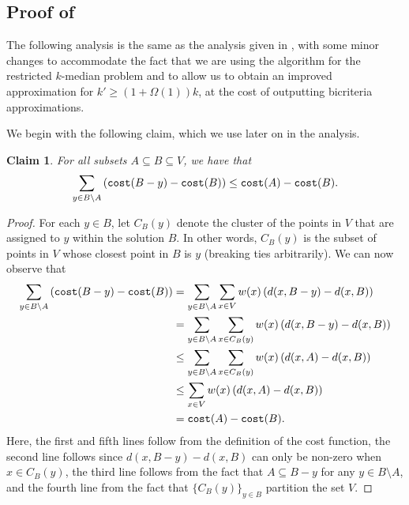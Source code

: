 \documentclass[11pt]{article}
\newcommand{\1}{\mathmybb{1}}
\newtheorem{claim}[theorem]{Claim}
\newcommand{\cost}{\textnormal{\texttt{cost}}}
\begin{document}
\subsection{Proof of }

The following analysis is the same as the analysis given in \cite{ChrobakKY06}, with some minor changes to accommodate the fact that we are using the algorithm for the restricted $k$-median problem and to allow us to obtain an improved approximation for $k' \geq (1 + \Omega(1))k$, at the cost of outputting bicriteria approximations.


We begin with the following claim, which we use later on in the analysis.

\begin{claim}\label{claim:greedy:proof}
    For all subsets $A \subseteq B \subseteq V$, we have that
    $$ \sum_{y \in B \setminus A} \left( \cost(B-y) - \cost(B) \right) \leq \cost(A) - \cost(B). $$
\end{claim}

\begin{proof}
    For each $y \in B$, let $C_{B}(y)$ denote the cluster of the points in $V$ that are assigned to $y$ within the solution $B$. In other words, $C_B(y)$ is the subset of points in $V$ whose closest point in $B$ is $y$ (breaking ties arbitrarily). We can now observe that
    \begin{align*}
        \sum_{y \in B \setminus A} \left( \cost(B-y) - \cost(B) \right) &= \sum_{y \in B \setminus A} \sum_{x \in V} w(x)\left( d(x, B-y) - d(x,B) \right)\\
        &= \sum_{y \in B \setminus A} \sum_{x \in C_B(y)} w(x) \left( d(x, B-y) - d(x,B) \right)\\
        &\leq \sum_{y \in B \setminus A} \sum_{x \in C_B(y)} w(x) \left( d(x, A) - d(x,B) \right)\\
        &\leq \sum_{x \in V} w(x) \left( d(x, A) - d(x,B) \right)\\
        &= \cost(A) - \cost(B).
    \end{align*}
    Here, the first and fifth lines follow from the definition of the cost function, the second line follows since $d(x, B - y) - d(x, B)$ can only be non-zero when $x \in C_B(y)$, the third line follows from the fact that $A \subseteq B - y$ for any $y \in B \setminus A$, and the fourth line from the fact that $\{C_B(y)\}_{y \in B}$ partition the set $V$.
\end{proof}
\end{document}
